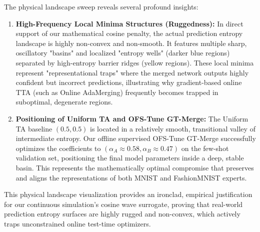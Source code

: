 The physical landscape sweep reveals several profound insights:
\begin{enumerate}[noitemsep,topsep=0pt]
    \item \textbf{High-Frequency Local Minima Structures (Ruggedness):} In direct support of our mathematical cosine penalty, the actual prediction entropy landscape is highly non-convex and non-smooth. It features multiple sharp, oscillatory "basins" and localized "entropy wells" (darker blue regions) separated by high-entropy barrier ridges (yellow regions). These local minima represent "representational traps" where the merged network outputs highly confident but incorrect predictions, illustrating why gradient-based online TTA (such as Online AdaMerging) frequently becomes trapped in suboptimal, degenerate regions.
    \item \textbf{Positioning of Uniform TA and OFS-Tune GT-Merge:} The Uniform TA baseline $(0.5, 0.5)$ is located in a relatively smooth, transitional valley of intermediate entropy. Our offline supervised OFS-Tune GT-Merge successfully optimizes the coefficients to $(\alpha_A \approx 0.58, \alpha_B \approx 0.47)$ on the few-shot validation set, positioning the final model parameters inside a deep, stable basin. This represents the mathematically optimal compromise that preserves and aligns the representations of both MNIST and FashionMNIST experts.
\end{enumerate}
This physical landscape visualization provides an ironclad, empirical justification for our continuous simulation's cosine wave surrogate, proving that real-world prediction entropy surfaces are highly rugged and non-convex, which actively traps unconstrained online test-time optimizers.



